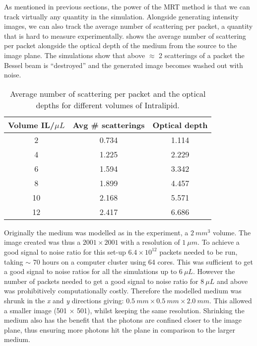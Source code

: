 As mentioned in previous sections, the power of the MRT method is that we can track virtually any quantity in the simulation.
Alongside generating intensity images, we can also track the average number of scattering per packet, a quantity that is hard to measure experimentally.
 shows the average number of scattering per packet alongside the optical depth of the medium from the source to the image plane.
The simulations show that above $\approx$ 2 scatterings of a packet the Bessel beam is ``destroyed'' and the generated image becomes washed out with noise.

\begin{table}[!ht]
    \centering
    \begin{tabular}{c|c|c}
    Volume IL/$\mu L$ & Avg \# scatterings & Optical depth \\ \hline
    2      & 0.734              & 1.114         \\
    4      & 1.225              & 2.229         \\
    6      & 1.594              & 3.342         \\
    8      & 1.899              & 4.457         \\
    10     & 2.168              & 5.571         \\
    12     & 2.417              & 6.686        
    \end{tabular}
    \caption{Average number of scattering per packet and the optical depths for different volumes of Intralipid.}
    \label{tab:numscatt}
\end{table}

Originally the medium was modelled as in the experiment, a $2~mm^3$ volume.
The image created was thus a $2001 \times 2001$ with a resolution of $1~\mu m$.
To achieve a good signal to noise ratio for this set-up $6.4\times10^{12}$ packets needed to be run, taking $\sim$ 70 hours on a computer cluster using 64 cores.
This was sufficient to get a good signal to noise ratios for all the simulations up to $6~\mu L$.
However the number of packets needed to get a good signal to noise ratio for $8~\mu L$ and above was prohibitively computationally costly.
Therefore the modelled medium was shrunk in the \textit{x} and \textit{y} directions giving: $0.5~mm \times 0.5~mm \times 2.0~mm$.
This allowed a smaller image (501 $\times$ 501), whilst keeping the same resolution.
Shrinking the medium also has the benefit that the photons are confined closer to the image plane, thus ensuring more photons hit the plane in comparison to the larger medium. 

